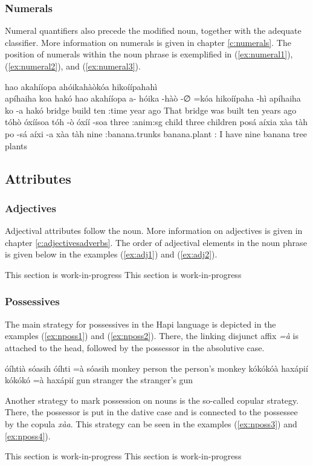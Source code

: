 \documentclass[a4paper, 12pt, oneside]{memoir}
\newcommand{\emh}[1]{\textit{#1}}
\begin{document}
\subsubsection{Numerals}
Numeral quantifiers also precede the modified noun, together with the adequate classifier. More information on numerals is given in chapter \ref{c:numerals}.  The position of numerals within the noun phrase is exemplified in (\ref{ex:numeral1}), (\ref{ex:numeral2}), and (\ref{ex:numeral3}).
\begin{examples}
\ex \label{ex:numeral1} 
\words hao akahííopa ahóikahàòkóa hikoíípahahì \\ {apíhaiha koa} hakó
\bits hao akahííopa a- hóika -hàò -∅ =kóa  hikoíípaha -hì {apíhaiha ko} -a hakó
\gloss {\Dem} bridge {\Pass} build {\Dpasto} {\St} {\Decl} ten {\Cl}:time year {\Pl} ago
\tr That bridge was built ten years ago
\ex \label{ex:numeral2}
\words tóhò óxíísoa
\bits tóh -ò óxíí -soa
\gloss three {\Cl}:anim:sg child {\Pl}
\tr three children
\ex \label{ex:numeral3}
\words posá aíxia xàa tàh
\bits po -sá aíxi -a xàa tàh
\gloss nine {\Cl}:banana.trunks banana.plant {\Pl} {\Cop} {\Fs}:{\Dat}
\tr I have nine banana tree plants
\end{examples}
\subsection{Attributes}\label{sattributes}
\subsubsection{Adjectives}
Adjectival attributes follow the noun. More information on adjectives is given in chapter \ref{c:adjectivesadverbs}. The order of adjectival elements in the noun phrase is given below in the examples (\ref{ex:adj1}) and (\ref{ex:adj2}).
\begin{examples}
\ex \label{ex:adj1}
This section is work-in-progress
\ex \label{ex:adj2}
This section is work-in-progress
\end{examples}
\subsubsection{Possessives}
The main strategy for possessives in the Hapi language is depicted in the examples (\ref{ex:nposs1}) and (\ref{ex:nposs2}). There, the linking disjunct affix \emh{=à} is attached to the head, followed by the possessor in the absolutive case. 
\begin{examples}
\ex \label{ex:nposs1}
\words óíhtià sóasih
\bits óíhti =à sóasih
\gloss monkey {\Link} person
\tr the person's monkey
\ex \label{ex:nposs2}
\words kókókóà haxápií
\bits kókókó =à haxápií
\gloss gun {\Link} stranger
\tr the stranger's gun
\end{examples}
Another strategy to mark possession on nouns is the so-called copular strategy. There, the possessor is put in the dative case and is connected to the possessee by the copula \emh{xàa}. This strategy can be seen in the examples (\ref{ex:nposs3}) and \ref{ex:nposs4}).
\begin{examples}
\ex \label{ex:nposs3}
This section is work-in-progress
\ex \label{ex:nposs4}
This section is work-in-progress
\end{examples}
\end{document}
